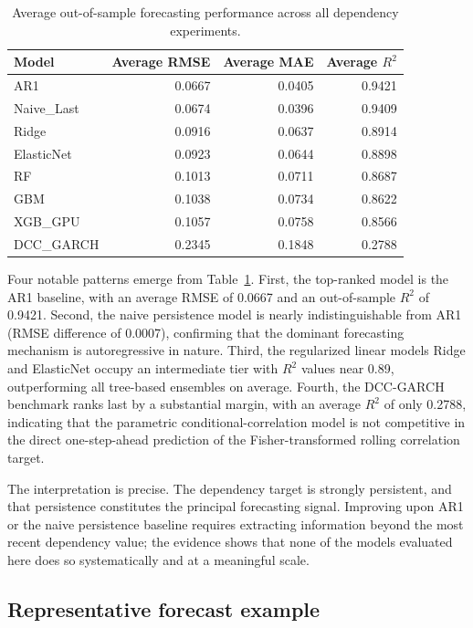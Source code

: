 \begin{table}[H]
    \centering
    \caption{Average out-of-sample forecasting performance across all dependency experiments.}
    \label{tab:model_ranking_summary}
    \begin{tabular}{lrrr}
        \toprule
        Model & Average RMSE & Average MAE & Average $R^2$ \\
        \midrule
        AR1 & 0.0667 & 0.0405 & 0.9421 \\
        Naive\_Last & 0.0674 & 0.0396 & 0.9409 \\
        Ridge & 0.0916 & 0.0637 & 0.8914 \\
        ElasticNet & 0.0923 & 0.0644 & 0.8898 \\
        RF & 0.1013 & 0.0711 & 0.8687 \\
        GBM & 0.1038 & 0.0734 & 0.8622 \\
        XGB\_GPU & 0.1057 & 0.0758 & 0.8566 \\
        DCC\_GARCH & 0.2345 & 0.1848 & 0.2788 \\
        \bottomrule
    \end{tabular}
\end{table}

Four notable patterns emerge from Table~\ref{tab:model_ranking_summary}. First, the top-ranked model is the AR1 baseline, with an average RMSE of 0.0667 and an out-of-sample $R^2$ of 0.9421. Second, the naive persistence model is nearly indistinguishable from AR1 (RMSE difference of 0.0007), confirming that the dominant forecasting mechanism is autoregressive in nature. Third, the regularized linear models Ridge and ElasticNet occupy an intermediate tier with $R^2$ values near 0.89, outperforming all tree-based ensembles on average. Fourth, the DCC-GARCH benchmark ranks last by a substantial margin, with an average $R^2$ of only 0.2788, indicating that the parametric conditional-correlation model is not competitive in the direct one-step-ahead prediction of the Fisher-transformed rolling correlation target.

The interpretation is precise. The dependency target is strongly persistent, and that persistence constitutes the principal forecasting signal. Improving upon AR1 or the naive persistence baseline requires extracting information beyond the most recent dependency value; the evidence shows that none of the models evaluated here does so systematically and at a meaningful scale.

\subsection{Representative forecast example}

